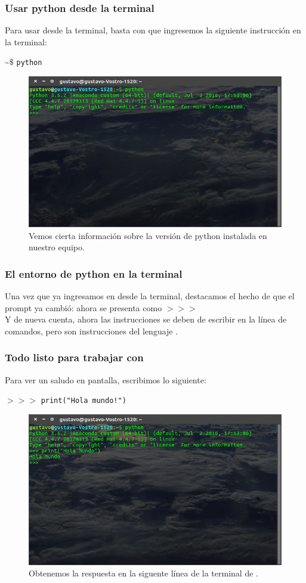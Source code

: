 \begin{frame}
\frametitle{Usar python desde la terminal}
Para usar \python desde la terminal, basta con que ingresemos la siguiente instrucción en la terminal:
\begin{center}
\textasciitilde $\$$ \texttt{python} \keys{\return}
\end{center}
\pause
\begin{figure}
	\centering
	\includegraphics[scale=0.25]{Terminal_02}
	\caption{Vemos cierta información sobre la versión de python instalada en nuestro equipo.}
\end{figure}
\end{frame}
\begin{frame}
\frametitle{El entorno de python en la terminal}
Una vez que ya ingresamos en \python desde la terminal, destacamos el hecho de que el prompt ya cambió: ahora se presenta como $>>>$
\\
\bigskip
Y de nueva cuenta, ahora las instrucciones se deben de escribir en la línea de comandos, pero son instrucciones del lenguaje \python.	
\end{frame}
\begin{frame}
\frametitle{Todo listo para trabajar con \python}
Para ver un saludo en pantalla, escribimos lo siguiente:
\begin{center}
$>>>$ \texttt{print("Hola mundo!")} \keys{\return}
\end{center}
\pause
\begin{figure}
	\centering
	\includegraphics[scale=0.25]{Terminal_03}
	\caption{Obtenemos la respuesta en la siguente línea de la terminal de \python.}
\end{figure}
\end{frame}
